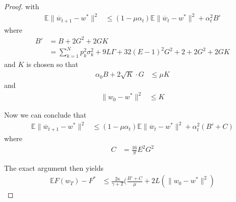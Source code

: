 \begin{proof}
	with 
	\begin{align*}
	\mathbb{E}\|\overline{w}_{t+1}-w^{\ast}\|^{2} & \leq(1-\mu\alpha_{t})\mathbb{E}\|\overline{w}_{t}-w^{\ast}\|^{2}+\alpha_{t}^{2}B'
	\end{align*}
	where 
	\begin{align*}
	B' & =B+2G^{2}+2GK\\
	& =\sum_{k=1}^{N}p_{k}^{2}\sigma_{k}^{2}+9L\Gamma+32(E-1)^{2}G^{2}+2+2G^{2}+2GK
	\end{align*}
	and $K$ is chosen so that 
	\begin{align*}
	\alpha_{0}B+2\sqrt{K}\cdot G & \leq\mu K
	\end{align*}
	and
	\begin{align*}
	\|w_{0}-w^{\ast}\|^{2} & \leq K
	\end{align*}
	
	Now we can conclude that 
	\begin{align*}
	\mathbb{E}\|\overline{w}_{t+1}-w^{\ast}\|^{2} & \leq(1-\mu\alpha_{t})\mathbb{E}\|\overline{w}_{t}-w^{\ast}\|^{2}+\alpha_{t}^{2}(B'+C)
	\end{align*}
	where 
	\begin{align*}
	C & =\frac{16}{S}E^{2}G^{2}
	\end{align*}
	
	The exact argument then yields 
	\begin{align*}
	\mathbb{E}F(w_{T})-F^{\ast} & \leq\frac{2\kappa}{\gamma+T}(\frac{B'+C}{\mu}+2L(\|w_{0}-w^{\ast}\|^{2})
	\end{align*}
\end{proof}
